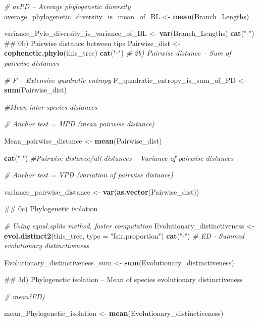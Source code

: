 \documentclass[]{book}
\newenvironment{Shaded}{\begin{snugshade}}{\end{snugshade}}
\newcommand{\KeywordTok}[1]{\textcolor[rgb]{0.13,0.29,0.53}{\textbf{{#1}}}}
\newcommand{\DataTypeTok}[1]{\textcolor[rgb]{0.13,0.29,0.53}{{#1}}}
\newcommand{\StringTok}[1]{\textcolor[rgb]{0.31,0.60,0.02}{{#1}}}
\newcommand{\CommentTok}[1]{\textcolor[rgb]{0.56,0.35,0.01}{\textit{{#1}}}}
\newcommand{\NormalTok}[1]{{#1}}
\theoremstyle{definition}
\theoremstyle{definition}
\theoremstyle{definition}
\theoremstyle{remark}
\begin{document}
\begin{Shaded}
\begin{Highlighting}[]
{    \CommentTok{# avPD -- Average phylogenetic diversity}
\NormalTok{    average_phylogenetic_diversity_is_mean_of_BL <-}\StringTok{ }\KeywordTok{mean}\NormalTok{(Branch_Lengths)}

\NormalTok{    variance_Pylo_diversity_is_variance_of_BL <-}\StringTok{ }\KeywordTok{var}\NormalTok{(Branch_Lengths)}
    \KeywordTok{cat}\NormalTok{(}\StringTok{"-"}\NormalTok{)}
\NormalTok{    ## 0b) Pairwise distance between tips}
\NormalTok{    Pairwise_dist <-}\StringTok{ }\KeywordTok{cophenetic.phylo}\NormalTok{(this_tree)}
    \KeywordTok{cat}\NormalTok{(}\StringTok{"-"}\NormalTok{)}
    \CommentTok{# 2b) Pairwise distance -- Sum of pairwise distances}

    \CommentTok{# F -- Extensive quadratic entropy}
\NormalTok{    F_quadratic_entropy_is_sum_of_PD <-}\StringTok{ }\KeywordTok{sum}\NormalTok{(Pairwise_dist)}

    \CommentTok{#Mean inter-species distances}

    \CommentTok{# Anchor test = MPD (mean pairwise distance)}

\NormalTok{    Mean_pairwise_distance <-}\StringTok{ }\KeywordTok{mean}\NormalTok{(Pairwise_dist)}

    \KeywordTok{cat}\NormalTok{(}\StringTok{"-"}\NormalTok{)}
    \CommentTok{#Pairwise distance/all distances -- Variance of pairwise distances}

    \CommentTok{# Anchor test = VPD (variation of pairwise distance)}

\NormalTok{    variance_pairwise_distance <-}\StringTok{ }\KeywordTok{var}\NormalTok{(}\KeywordTok{as.vector}\NormalTok{(Pairwise_dist))}

\NormalTok{    ## 0c) Phylogenetic isolation}

    \CommentTok{# Using equal.splits method, faster computation}
\NormalTok{    Evolutionary_distinctiveness <-}\StringTok{ }\KeywordTok{evol.distinct2}\NormalTok{(this_tree, }\DataTypeTok{type =} \StringTok{"fair.proportion"}\NormalTok{)}
    \KeywordTok{cat}\NormalTok{(}\StringTok{"-"}\NormalTok{)}
    \CommentTok{# ED - Summed evolutionary distinctiveness}

\NormalTok{    Evolutionary_distinctiveness_sum <-}\StringTok{ }\KeywordTok{sum}\NormalTok{(Evolutionary_distinctiveness)}

\NormalTok{    ## 3d) Phylogenetic isolation -- Mean of species evolutionary distinctiveness}

    \CommentTok{# mean(ED)}

\NormalTok{    mean_Phylogenetic_isolation <-}\StringTok{ }\KeywordTok{mean}\NormalTok{(Evolutionary_distinctiveness)}

}
\end{Highlighting}
\end{Shaded}
\end{document}

